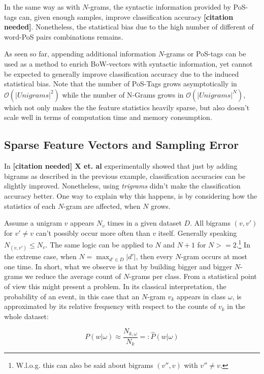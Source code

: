 In the same way as with $N$-grams, the syntactic information provided by PoS-tags
can, given enough samples, improve classification accuracy \textbf{[citation
needed]}.
Nonetheless, the statistical bias due to the high number of different of
word-PoS pairs combinations remains.

As seen so far, appending additional information $N$-grams or PoS-tags can be used as a method
to enrich BoW-vectors with syntactic information, yet cannot be
expected to generally improve classification accuracy due to the induced
statistical bias. Note that the number of PoS-Tags grows asymptotically 
in $\mathcal{O}(|Unigrams|^2)$ while the number of N-Grams grows in
$\mathcal{O}(|Unigrams|^N)$, which not only makes the the feature statistics
heavily sparse, but also doesn't scale well in terms of computation time and memory consumption.

\subsection{Sparse Feature Vectors and Sampling Error}


In \textbf{[citation needed] X et. al} experimentally showed that just by adding
bigrams as described in the previous example, classification accuracies can be
slightly improved.
Nonetheless, using \textit{trigrams} didn't make the classification accuracy better. 
One way to explain why this happens, is by considering how the
statistics of each $N$-gram are affected, when $N$ grows.
 
Assume a unigram $v$ appears $N_v$ times in a given dataset $D$. All bigrams
$(v,v')$ for $v' \neq v$ can't possibly occur more often than  $v$ itself.
Generally speaking $N_{(v,v')} \leq N_v$. 
The same logic can be applied to $N$ and $N+1$ for $N >= 2$.\footnote{W.l.o.g.
this can also be said about bigrams $(v'',v)$ with $v '' \neq v$.} In the
extreme case, when $N = \max_{d' \in D} |d'|$, then every $N$-gram occurs at most one time. In short,
what we observe is that by building bigger and bigger $N$-grams we reduce the 
average count of $N$-grams per class. From a statistical point of view this
might present a problem. In its classical interpretation, the probability of an event, 
in this case that an 
$N$-gram $v_k$ appears in class $\omega$, is approximated by
its relative frequency with respect to the counts of $v_k$ in the whole dataset: 

\begin{equation}
	P(w|\omega) \approx \frac{N_{k,\omega}}{N_k} =:
	\hat{P}(w|\omega)
\end{equation}

